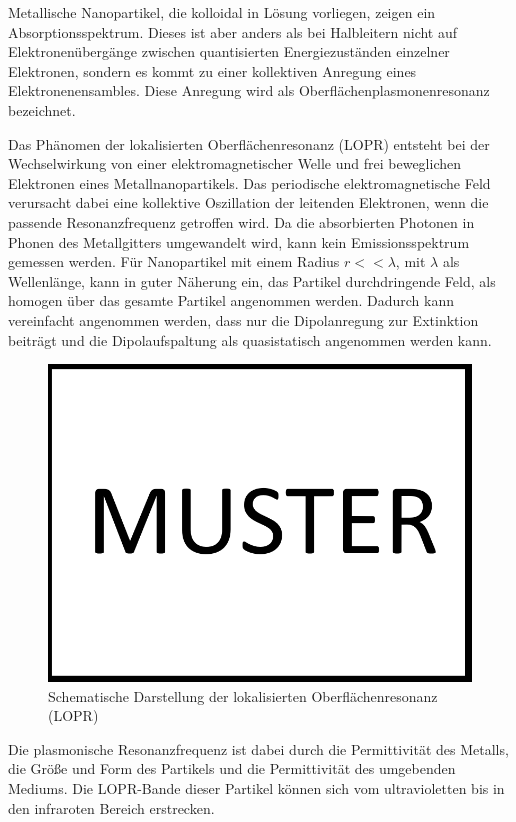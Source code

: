     Metallische Nanopartikel, die kolloidal in Lösung vorliegen, zeigen ein Absorptionsspektrum.
    Dieses ist aber anders als bei Halbleitern nicht auf Elektronenübergänge zwischen quantisierten Energiezuständen einzelner Elektronen, sondern es kommt zu einer kollektiven Anregung eines Elektronenensambles.
    Diese Anregung wird als Oberflächenplasmonenresonanz bezeichnet. \autocite{Mulvaney1996}
    
    Das Phänomen der lokalisierten Oberflächenresonanz (LOPR) entsteht bei der Wechselwirkung von einer elektromagnetischer Welle und frei beweglichen Elektronen eines Metallnanopartikels.\autocite{Hu2006}
    Das periodische elektromagnetische Feld verursacht dabei eine kollektive Oszillation der leitenden Elektronen, wenn die passende Resonanzfrequenz getroffen wird.
    Da die absorbierten Photonen in Phonen des Metallgitters umgewandelt wird, kann kein Emissionsspektrum gemessen werden.
    Für Nanopartikel mit einem Radius $r<<\lambda$, mit $\lambda$ als Wellenlänge, kann in guter Näherung ein, das Partikel durchdringende Feld, als homogen über das gesamte Partikel angenommen werden. \autocite{Xu1999}
    Dadurch kann vereinfacht angenommen werden, dass nur die Dipolanregung zur Extinktion beiträgt und die Dipolaufspaltung als quasistatisch angenommen werden kann.
    
    \begin{figure}
        \centering
        \includegraphics[width=0.6\linewidth]{Bilder/Muster}
        \caption{Schematische Darstellung der lokalisierten Oberflächenresonanz (LOPR)}
        \label{fig:LOPR}
    \end{figure}
    
    Die plasmonische Resonanzfrequenz ist dabei durch die Permittivität des Metalls, die Größe und Form des Partikels und die Permittivität des umgebenden Mediums. \autocite{Kelly2003,Mock2003}
    Die LOPR-Bande dieser Partikel können sich vom ultravioletten bis in den infraroten Bereich erstrecken. \autocite{Haes2004}
    
